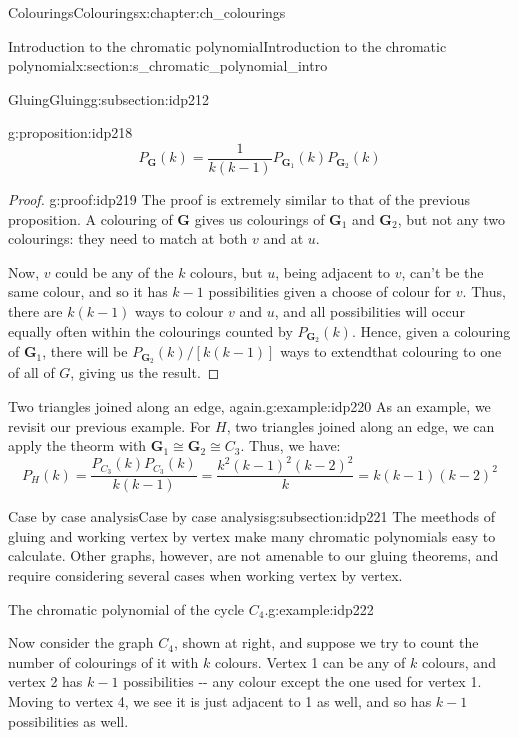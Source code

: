 \documentclass[oneside,10pt,]{book}
\numberwithin{equation}{section}
\newcommand{\bfG}{\mathbf{G}}
\begin{document}
\begin{chapterptx}{Colourings}{}{Colourings}{}{}{x:chapter:ch_colourings}
\begin{sectionptx}{Introduction to the chromatic polynomial}{}{Introduction to the chromatic polynomial}{}{}{x:section:s_chromatic_polynomial_intro}
\begin{subsectionptx}{Gluing}{}{Gluing}{}{}{g:subsection:idp212}
\begin{proposition}{}{}{g:proposition:idp218}
%
\begin{equation*}
P_{\bfG}(k)=\frac{1}{k(k-1)}P_{\bfG_1}(k)P_{\bfG_2}(k)
\end{equation*}
\end{proposition}
\begin{proof}{}{g:proof:idp219}
The proof is extremely similar to that of the previous proposition.  A colouring of \(\bfG\) gives us colourings of \(\bfG_1\) and \(\bfG_2\), but not any two colourings: they need to match at both \(v\) and at \(u\).%
\par
Now, \(v\) could be any of the \(k\) colours, but \(u\), being adjacent to \(v\), can't be the same colour, and so it has \(k-1\) possibilities given a choose of colour for \(v\).  Thus, there are \(k(k-1)\) ways to colour \(v\) and \(u\), and all possibilities will occur equally often within the colourings counted by \(P_{\bfG_2}(k)\).  Hence, given a colouring of \(\bfG_1\), there will be \(P_{\bfG_2}(k)/[k(k-1)]\) ways to extendthat colouring to one of all of \(G\), giving us the result.%
\end{proof}
\begin{example}{Two triangles joined along an edge, again.}{g:example:idp220}%
As an example, we revisit our previous example.  For \(H\), two triangles joined along an edge, we can apply the theorm with \(\bfG_1\cong \bfG_2\cong C_3\).  Thus, we have:%
%
\begin{equation*}
P_H(k)=\frac{P_{C_3}(k)P_{C_3}(k)}{k(k-1)}=\frac{k^2(k-1)^2(k-2)^2}{k}=k(k-1)(k-2)^2
\end{equation*}
\end{example}
\end{subsectionptx}
%
%
\typeout{************************************************}
\typeout{************************************************}
%
\begin{subsectionptx}{Case by case analysis}{}{Case by case analysis}{}{}{g:subsection:idp221}
The meethods of gluing and working vertex by vertex make many chromatic polynomials easy to calculate.  Other graphs, however, are not amenable to our gluing theorems, and require considering several cases when working vertex by vertex.%
\begin{example}{The chromatic polynomial of the cycle \(C_4\).}{g:example:idp222}%
\begin{sidebyside}{2}{0.025}{0.025}{0.05}%
\begin{sbspanel}{0.6}%
Now consider the graph \(C_4\), shown at right, and suppose we try to count the number of colourings of it with \(k\) colours.  Vertex 1 can be any of \(k\) colours, and vertex 2 has \(k-1\) possibilities -{}-{} any colour except the one used for vertex 1.  Moving to vertex 4, we see it is just adjacent to 1 as well, and so has \(k-1\) possibilities as well.%

\end{sbspanel}
\end{sidebyside}
\end{example}
\end{subsectionptx}
\end{sectionptx}
\end{chapterptx}
\end{document}
